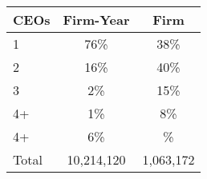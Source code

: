 \begin{tabular}{lcc}
\toprule
CEOs & Firm-Year & Firm \\
\midrule
1 & 76\% & 38\% \\
2 & 16\% & 40\% \\
3 & 2\% & 15\% \\
4+ & 1\% & 8\% \\
4+ & 6\% & \% \\
Total &   10,214,120 &    1,063,172 \\
\bottomrule
\end{tabular}
